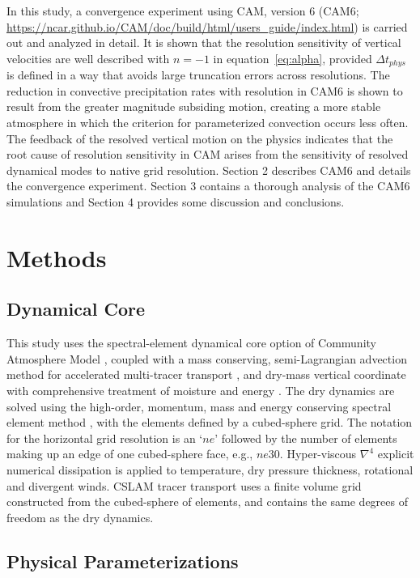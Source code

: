\documentclass[times]{qjrms4}
\begin{document}
In this study, a convergence experiment using CAM, version 6 (CAM6; \url{https://ncar.github.io/CAM/doc/build/html/users_guide/index.html}) is carried out and analyzed in detail. It is shown that the resolution sensitivity of vertical velocities are well described with $n=-1$ in equation~\eqref{eq:alpha}, provided $\Delta t_{phys}$ is defined in a way that avoids large truncation errors across resolutions. The reduction in convective precipitation rates with resolution in CAM6 is shown to result from the greater magnitude subsiding motion, creating a more stable atmosphere in which the criterion for parameterized convection occurs less often. The feedback of the resolved vertical motion on the physics indicates that the root cause of resolution sensitivity in CAM arises from the sensitivity of resolved dynamical modes to native grid resolution. Section 2 describes CAM6 and details the convergence experiment. Section 3 contains a thorough analysis of the CAM6 simulations and Section 4 provides some discussion and conclusions.

\section{Methods}

\subsection{Dynamical Core}

This study uses the spectral-element dynamical core option of Community Atmosphere Model \citep[CAM-SE;][]{DetAl2012IJHPCA}, coupled with a mass conserving, semi-Lagrangian advection method for accelerated multi-tracer transport \citep[CSLAM;][]{LTOUNGK2017MWR}, and dry-mass vertical coordinate with comprehensive treatment of moisture and energy \citep{LetAl2018JAMES}. The dry dynamics are solved using the high-order, momentum, mass and energy conserving spectral element method \citep{TF2010JCP}, with the elements defined by a cubed-sphere grid. The notation for the horizontal grid resolution is an `$ne$' followed by the number of elements making up an edge of one cubed-sphere face, e.g., $ne30$. Hyper-viscous $\nabla^{4}$ explicit numerical dissipation is applied to temperature, dry pressure thickness, rotational and divergent winds. CSLAM tracer transport uses a finite volume grid constructed from the cubed-sphere of elements, and contains the same degrees of freedom as the dry dynamics.

\subsection{Physical Parameterizations}
\end{document}
